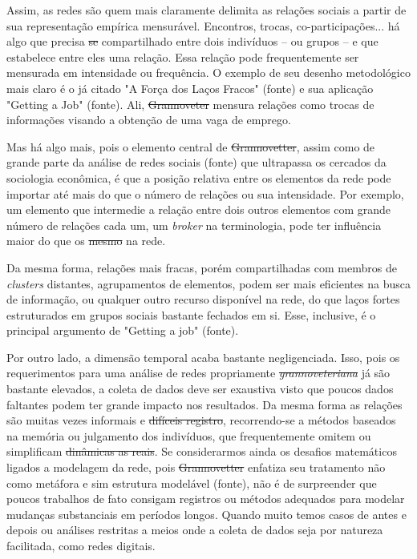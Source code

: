 Assim, as redes são quem mais claramente delimita as relações sociais
a partir de sua representação empírica mensurável. Encontros, trocas,
co-participações... há algo que precisa \sout{se} compartilhado entre dois indivíduos -- ou grupos -- e que estabelece entre eles uma relação. Essa relação pode frequentemente ser mensurada em intensidade ou frequência. O exemplo de seu desenho metodológico mais claro é o já citado "A Força dos Laços Fracos" (fonte) e sua aplicação "Getting a Job" (fonte). Ali, \sout{Grannoveter} mensura relações como trocas de informações visando a obtenção de uma vaga de emprego.

Mas há algo mais, pois o elemento central de \sout{Grannovetter}, assim como
de grande parte da análise de redes sociais (fonte) que ultrapassa
os cercados da sociologia econômica, é que a posição relativa entre os
elementos da rede pode importar até mais do que o número de relações ou sua intensidade.
Por exemplo, um elemento que intermedie a relação entre dois  outros elementos com grande número de relações cada um, um \emph{broker} na terminologia, pode ter
influência maior do que os \sout{mesmo} na rede.

Da mesma forma, relações mais fracas, porém compartilhadas com membros
de \emph{clusters} distantes, agrupamentos de elementos, podem ser mais
eficientes na busca de informação, ou qualquer outro recurso disponível na rede, do que laços fortes estruturados
em grupos sociais bastante fechados em si. Esse, inclusive, é o principal argumento de "Getting a job" (fonte).

Por outro lado, a dimensão temporal acaba bastante negligenciada. Isso, pois os requerimentos para uma análise de redes propriamente \emph{\sout{grannoveteriana}} já são bastante elevados, a coleta de dados deve ser exaustiva visto que poucos dados faltantes podem ter grande impacto nos resultados.
Da mesma forma as relações são muitas vezes informais e \sout{difíceis registro}, recorrendo-se a métodos baseados na memória ou julgamento
dos indivíduos, que frequentemente omitem ou simplificam \sout{dinâmicas as reais}. Se considerarmos ainda os desafios matemáticos ligados a modelagem da rede, pois \sout{Grannovetter} enfatiza seu tratamento não como metáfora e sim estrutura modelável (fonte), não é de surpreender que poucos
trabalhos de fato consigam registros ou métodos adequados para modelar mudanças substanciais em períodos longos. Quando muito temos casos de antes e depois ou análises restritas a meios onde a coleta de dados seja por natureza facilitada, como redes digitais.

